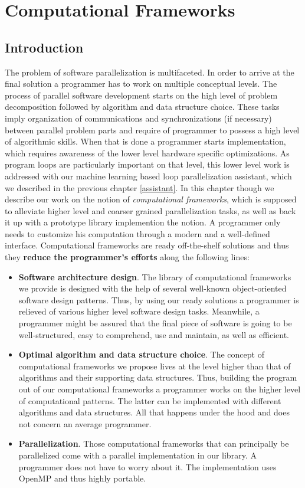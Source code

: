 \chapter{Computational Frameworks}
\label{frameworks}
\section{Introduction}
\label{frameworks_introduction}
\quad The problem of software parallelization is multifaceted. In order to arrive at the final solution a programmer has to work on multiple conceptual levels. The process of parallel software development starts on the high level of problem decomposition followed by algorithm and data structure choice. These tasks imply organization of communications and synchronizations (if necessary) between parallel problem parts and require of programmer to possess a high level of algorithmic skills. When that is done a programmer starts implementation, which requires awareness of the lower level hardware specific optimizations. As program loops are particularly important on that level, this lower level work is addressed with our machine learning based loop parallelization assistant, which we described in the previous chapter \ref{assistant}. In this chapter though we describe our work on the notion of \textit{computational frameworks}, which is supposed to alleviate higher level and coarser grained parallelization tasks, as well as back it up with a prototype library implemention the notion. A programmer only needs to customize his computation through a modern and a well-defined interface.\newline\null
\quad Computational frameworks are ready off-the-shelf solutions and thus they \textbf{reduce the programmer's efforts} along the following lines:
\begin{itemize}[style=unboxed,leftmargin=0cm]
\itemsep0em
\renewcommand\labelitemi{$\vartriangleright$}
\renewcommand\labelitemii{$\bullet$}
\item \textbf{Software architecture design}. The library of computational frameworks we provide is designed with the help of several well-known object-oriented software design patterns. Thus, by using our ready solutions a programmer is relieved of various higher level software design tasks. Meanwhile, a programmer might be assured that the final piece of software is going to be well-structured, easy to comprehend, use and maintain, as well as efficient.
\item \textbf{Optimal algorithm and data structure choice}. The concept of computational frameworks we propose lives at the level higher than that of algorithms and their supporting data structures. Thus, building the program out of our computational frameworks a programmer works on the higher level of computational patterns. The latter can be implemented with different algorithms and data structures. All that happens under the hood and does not concern an average programmer. 
\item \textbf{Parallelization}. Those computational frameworks that can principally be parallelized come with a parallel implementation in our library. A programmer does not have to worry about it. The implementation uses OpenMP and thus highly portable.
\end{itemize}

